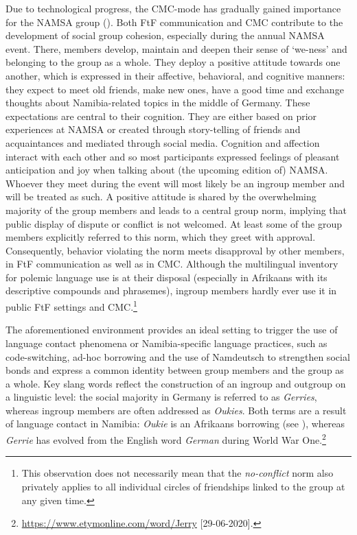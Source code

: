 \documentclass[output=paper]{langsci/langscibook}
\begin{document}
Due to technological progress, the CMC-mode has gradually gained importance for the NAMSA group (\citealt{radke_urban_inpress}). Both FtF communication and CMC contribute to the development of social group cohesion, especially during the annual NAMSA event. There, members develop, maintain and deepen their sense of ‘we-ness’ and belonging to the group as a whole. They deploy a positive attitude towards one another, which is expressed in their affective, behavioral, and cognitive manners: they expect to meet old friends, make new ones, have a good time and exchange thoughts about Namibia-related topics in the middle of Germany. These expectations are central to their cognition. They are either based on prior experiences at NAMSA or created through story-telling of friends and acquaintances and mediated through social media. Cognition and affection interact with each other and so most participants expressed feelings of pleasant anticipation and joy when talking about (the upcoming edition of) NAMSA. Whoever they meet during the event will most likely be an ingroup member and will be treated as such. A positive attitude is shared by the overwhelming majority of the group members and leads to a central group norm, implying that public display of dispute or conflict is not welcomed. At least some of the group members explicitly referred to this norm, which they greet with approval. Consequently, behavior violating the norm meets disapproval by other members, in FtF communication as well as in CMC. Although the multilingual inventory for polemic language use is at their disposal (especially in Afrikaans with its descriptive compounds and phrasemes), ingroup members hardly ever use it in public FtF settings and CMC.\footnote{This observation does not necessarily mean that the \textit{no-conflict} norm also privately applies to all individual circles of friendships linked to the group at any given time.}

The aforementioned environment provides an ideal setting to trigger the use of language contact phenomena or Namibia-specific language practices, such as code-switching, ad-hoc borrowing and the use of Namdeutsch to strengthen social bonds and express a common identity between group members and the group as a whole. Key slang words reflect the construction of an ingroup and outgroup on a linguistic level: the social majority in Germany is referred to as \textit{Gerries}, whereas ingroup members are often addressed as \textit{Oukies}. Both terms are a result of language contact in Namibia: \textit{Oukie} is an Afrikaans borrowing (see ), whereas \textit{Gerrie} has evolved from the English word \textit{German} during World War One.\footnote{\url{https://www.etymonline.com/word/Jerry} {[}29-06-2020{]}.}   
\end{document}
